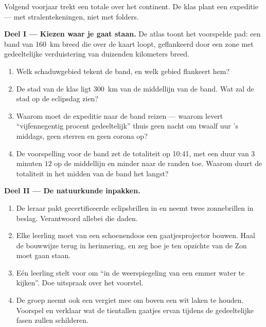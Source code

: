 \begin{problem}\label{pb:g7:shadows-eclipses:1}
Volgend voorjaar trekt een totale  over het
continent. De klas plant een expeditie --- met stralentekeningen, niet
met folders.

\medskip\noindent\textbf{Deel I --- Kiezen waar je gaat staan.}
De atlas toont het voorspelde pad: een band van \qty{160}{km} breed
die over de kaart loopt, geflankeerd door een zone met gedeeltelijke
verduistering van duizenden kilometers breed.
\begin{enumerate}
  \item Welk schaduwgebied tekent de band, en welk gebied flankeert
        hem?
  \item De stad van de klas ligt \qty{300}{km} van de middellijn van
        de band. Wat zal de stad op de eclipsdag zien?
  \item Waarom moet de expeditie naar de band reizen --- waarom
        levert ``vijfennegentig procent gedeeltelijk'' thuis geen
        nacht om twaalf uur 's middags, geen sterren en geen corona
        op?
  \item De voorspelling voor de band zet de totaliteit op 10:41, met
        een duur van $3$ minuten $12$  op de middellijn en
        minder naar de randen toe. Waarom duurt de totaliteit in het
        midden van de band het langst?
\end{enumerate}

\medskip\noindent\textbf{Deel II --- De natuurkunde inpakken.}
\begin{enumerate}[resume]
  \item De leraar pakt gecertificeerde eclipsbrillen in en neemt twee
        zonnebrillen in beslag. Verantwoord allebei die daden.
  \item Elke leerling moet van een schoenendoos een gaatjesprojector
        bouwen. Haal de bouwwijze terug in herinnering, en zeg hoe je
        ten opzichte van de Zon moet gaan staan.
  \item Eén leerling stelt voor om ``in de weerspiegeling van een
        emmer water te kijken''. Doe uitspraak over het voorstel.
  \item De groep neemt ook een vergiet mee om boven een wit laken te
        houden. Voorspel en verklaar wat de tientallen gaatjes ervan
        tijdens de gedeeltelijke fasen zullen schilderen.
\end{enumerate}


\end{problem}
